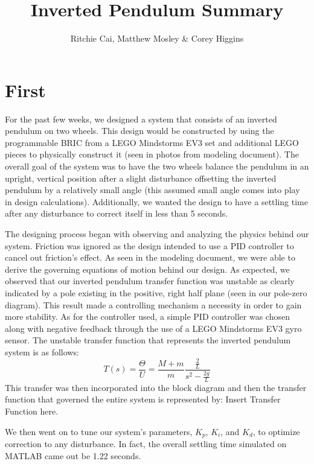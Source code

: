 \documentclass{notes}
\author{Ritchie Cai, Matthew Mosley \& Corey Higgins}
\title{Inverted Pendulum Summary}
\begin{document}
\maketitle 
\section{First}
For the past few weeks, we designed a system that consists of an inverted pendulum on two wheels. This design would be constructed by using the programmable BRIC from a LEGO Mindstorms EV3 set and additional LEGO pieces to physically construct it (seen in photos from modeling document). The overall goal of the system was to have the two wheels balance the pendulum in an upright, vertical position after a slight disturbance offsetting the inverted pendulum by a relatively small angle (this assumed small angle comes into play in design calculations). Additionally, we wanted the design to have a settling time after any disturbance to correct itself in less than 5 seconds.
   
The designing process began with observing and analyzing the physics behind our system. Friction was ignored as the design intended to use a PID controller to cancel out friction's effect. As seen in the modeling document, we were able to derive the governing equations of motion behind our design. As expected, we observed that our inverted pendulum transfer function was unstable as clearly indicated by a pole existing in the positive, right half plane (seen in our pole-zero diagram). This result made a controlling mechanism a necessity in order to gain more stability. As for the controller used, a simple PID controller was chosen along with negative feedback through the use of a LEGO Mindstorms EV3 gyro sensor. The unstable transfer function that represents the inverted pendulum system is as follows:
\[
  T(s) = \dfrac{\Theta}{U} = \dfrac{M+m}{m}\dfrac{\frac{2}{L}}{s^2-\frac{2g}{L}}
\]
This  transfer was then incorporated into the block diagram and then the transfer function that governed the entire system is represented by:
Insert Transfer Function here.

We then went on to tune our system's parameters, $K_p$, $K_i$, and $K_d$, to optimize correction to any disturbance. In fact, the overall settling time simulated on MATLAB came out be 1.22 seconds.         
\end{document}
